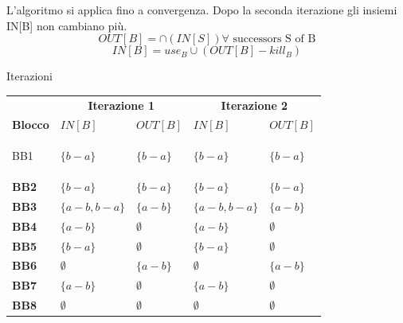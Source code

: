 \documentclass[a4paper, 9pt]{article}
\begin{document}
L'algoritmo si applica fino a convergenza. Dopo la seconda iterazione gli insiemi IN[B] non cambiano più. 
$$OUT[B] = \cap(IN[S]) \forall \text{ successors S of B}$$
$$IN[B] = use_B \cup (OUT[B] - kill_B)$$
\begin{tabelladfa}{Iterazioni}
    \centering
    \small %
    \renewcommand{\arraystretch}{1.3} %
    
    \begin{tabularx}{\textwidth}{>{\bfseries}l | X | X | X | X}
        
        \rowcolor{NavyBlue!40} %
        & \multicolumn{2}{c|}{\textbf{Iterazione 1}} & \multicolumn{2}{c}{\textbf{Iterazione 2}} \\
        
        \rowcolor{LabBlue!20}
        \textbf{Blocco} & \hfil $IN[B]$ \hfil & \hfil $OUT[B]$ \hfil & \hfil $IN[B]$ \hfil & \hfil $OUT[B]$ \hfil  \\
        \hline
        
        BB1 & $ \{b-a\}$ & $ \{b-a\} $ & $ \{b-a\}$ & $ \{b-a\} $   \\
        \hline
        BB2 & $\{b-a\}$&$\{b-a\}$ & $\{b-a\}$&$\{b-a\}$    \\
        \hline
        BB3 & $\{a - b,b-a\}$& $\{a-b\}$ & $\{a - b,b-a\}$& $\{a-b\}$\\
        \hline
        BB4 &$\{a - b\}$ & $\emptyset$ &$\{a - b\}$ & $\emptyset$  \\
        \hline
        BB5 & $\{b-a\}$& $\emptyset$ & $\{b-a\}$& $\emptyset$   \\
        \hline
        BB6 &$\emptyset$ & $\{a-b\}$ &$\emptyset$ & $\{a-b\}$ \\
        \hline
        BB7 &$\{a - b\}$ & $\emptyset$ &$\{a - b\}$ & $\emptyset$  \\
        \hline
        BB8 &$\emptyset$ & $\emptyset$ &$\emptyset$ & $\emptyset$   \\
    \end{tabularx}

\end{tabelladfa}
\pagebreak
\end{document}
